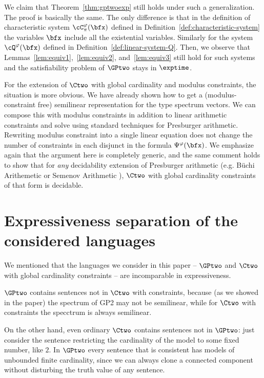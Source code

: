 We claim that Theorem~\ref{thm:gptwoexp} still holds under such a generalization.
The proof is basically the same.
The only difference is that in the definition of characteristic system
$\cC^\varphi_\pi(\bfx)$
defined in Definition~\ref{def:characteristic-system} the variables $\bfx$ include all the existential variables.
Similarly for the system $\cQ^\varphi(\bfx)$
defined in Definition~\ref{def:linear-system-Q}.
Then, we observe that
Lemmas~\ref{lem:equiv1},~\ref{lem:equiv2}, and~\ref{lem:equiv3} still hold for such systems
and the satisfiability problem of $\GPtwo$ stays in $\exptime$.

For the extension of $\Ctwo$ with global cardinality and modulus constraints, the situation is more obvious. We have already shown how to get a (modulus-constraint free) semilinear representation for the type spectrum vectors. We can compose this with modulus constraints in addition to linear arithmetic constraints and solve using standard techniques for Presburger arithmetic. 
Rewriting modulus constraint into a single linear equation does not change the number of constraints in each disjunct in the formula $\Psi^{\varphi}(\bfx)$.
We emphasize again that the argument here is completely generic, and the same comment holds to show that for \emph{any} decidability extension of Presburger arithmetic (e.g. B\"uchi Arithemetic or Semenov Arithmetic \cite{semenovpresexp}), $\Ctwo$ with global cardinality constraints of that form is decidable.


\section*{Expressiveness separation of the considered languages}
We mentioned that the languages we consider in this paper -- $\GPtwo$ and $\Ctwo$ with global cardinality constraints -- are incomparable in expressiveness.

$\GPtwo$  contains sentences not in $\Ctwo$ with constraints, because (as we showed in the paper) the spectrum of GP2 may not be semilinear, while for $\Ctwo$ with constraints the specctrum is always semilinear.

On the other hand, even ordinary $\Ctwo$ contains sentences not in $\GPtwo$: just consider the sentence restricting the cardinality of the model to some fixed number, like $2$. In $\GPtwo$ every sentence that is consistent has models of unbounded finite cardinality, since we can always clone a connected component without disturbing the truth value of any sentence.


